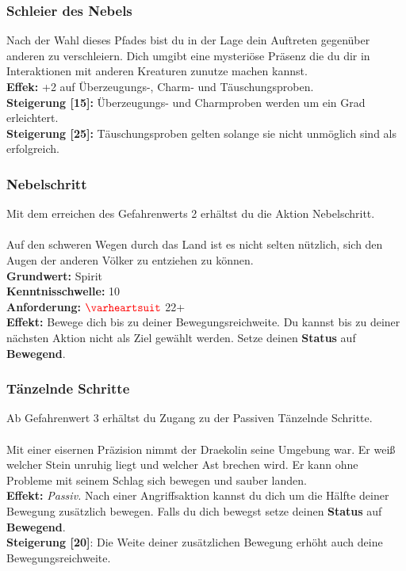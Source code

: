\subsubsection*{ Schleier des Nebels} \label{sk:schleier_des_nebels}
Nach der Wahl dieses Pfades bist du in der Lage dein Auftreten gegenüber anderen zu verschleiern. Dich umgibt eine mysteriöse Präsenz die du dir in Interaktionen mit anderen Kreaturen zunutze machen kannst.\\
\textbf{Effek:} +2 auf Überzeugungs-, Charm- und Täuschungsproben. \\
\textbf{Steigerung [15]:} Überzeugungs- und Charmproben werden um ein Grad erleichtert.\\
\textbf{Steigerung [25]:} Täuschungsproben gelten solange sie nicht unmöglich sind als erfolgreich.\\

\subsubsection*{ Nebelschritt} \label{sk:nebelschritt}
Mit dem erreichen des Gefahrenwerts 2 erhältst du die Aktion Nebelschritt.\\
\\
Auf den schweren Wegen durch das Land ist es nicht selten nützlich, sich den Augen der anderen Völker zu entziehen zu können.\\
\textbf{Grundwert:} Spirit \\
\textbf{Kenntnisschwelle:} 10 \\
\textbf{Anforderung:} $\Herz{}$ 22+ \\
\textbf{Effekt:} Bewege dich bis zu deiner Bewegungsreichweite. Du kannst bis zu deiner nächsten Aktion nicht als Ziel gewählt werden. Setze deinen \textbf{Status} auf \textbf{Bewegend}.

\subsubsection*{ Tänzelnde Schritte} \label{sk:tänzelnde_schritte}
Ab Gefahrenwert 3 erhältst du Zugang zu der Passiven Tänzelnde Schritte.\\
\\
Mit einer eisernen Präzision nimmt der Draekolin seine Umgebung war. Er weiß welcher Stein unruhig liegt und welcher Ast brechen wird. Er kann ohne Probleme mit seinem Schlag sich bewegen und sauber landen.\\
\textbf{Effekt:} \textit{Passiv.} Nach einer Angriffsaktion kannst du dich um die Hälfte deiner Bewegung zusätzlich bewegen. Falls du dich bewegst setze deinen \textbf{Status} auf \textbf{Bewegend}.\\
\textbf{Steigerung [20]}: Die Weite deiner zusätzlichen Bewegung erhöht auch deine Bewegungsreichweite.

